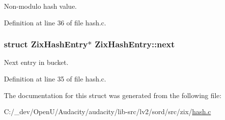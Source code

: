 Non-\/modulo hash value. 



Definition at line 36 of file hash.\+c.

\subsubsection[{\texorpdfstring{next}{next}}]{\setlength{\rightskip}{0pt plus 5cm}struct {\bf Zix\+Hash\+Entry}$\ast$ Zix\+Hash\+Entry\+::next}\hypertarget{struct_zix_hash_entry_a59ba09ec7815bf7bde1ea2d49d98a85c}{}\label{struct_zix_hash_entry_a59ba09ec7815bf7bde1ea2d49d98a85c}


Next entry in bucket. 



Definition at line 35 of file hash.\+c.



The documentation for this struct was generated from the following file\+:\begin{DoxyCompactItemize}
\item 
C\+:/\+\_\+dev/\+Open\+U/\+Audacity/audacity/lib-\/src/lv2/sord/src/zix/\hyperlink{hash_8c}{hash.\+c}\end{DoxyCompactItemize}
